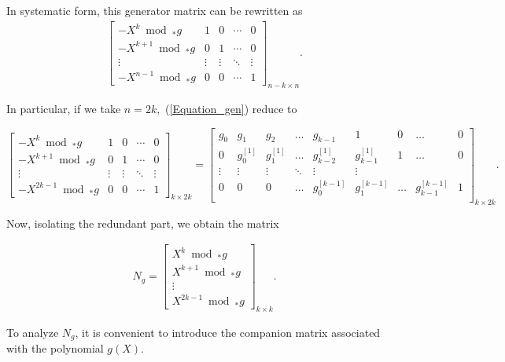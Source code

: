 \documentclass[11pt]{article}
\begin{document}
In systematic form, this generator matrix can be rewritten as
\begin{eqnarray}\label{Equation_gen}
  	\begin{bmatrix}
  		- X^k \bmod_\ast g & 1 & 0 & \cdots & 0 \\
  		- X^{k+1} \bmod_\ast g & 0 & 1 & \cdots & 0 \\
  		\vdots & \vdots & \vdots & \ddots & \vdots \\
  		- X^{n-1} \bmod_\ast g & 0 & 0 & \cdots & 1
  	\end{bmatrix}_{n-k\times n}.
\end{eqnarray}

In particular, if we take $n=2k,$ (\ref{Equation_gen}) reduce to 

$$\begin{bmatrix}
  		- X^k \bmod_\ast g & 1 & 0 & \cdots & 0 \\
  		- X^{k+1} \bmod_\ast g & 0 & 1 & \cdots & 0 \\
  		\vdots & \vdots & \vdots & \ddots & \vdots \\
  		- X^{2k-1} \bmod_\ast g & 0 & 0 & \cdots & 1
  	\end{bmatrix}_{k\times 2k}=\begin{bmatrix}
  	    g_0&g_1&g_2&\dots&g_{k-1}&1&0&\dots&0\\
        0&g^{[1]}_0&g^{[1]}_1&\dots&g^{[1]}_{k-2}&g^{[1]}_{k-1}&1&\dots&0\\
        \vdots&\vdots&\vdots&\ddots&\vdots&\vdots\\
        0&0&0&\dots&g^{[k-1]}_0&g^{[k-1]}_1&\dots&g^{[k-1]}_{k-1}&1\\
  	\end{bmatrix}_{k\times 2k}.$$

Now, isolating the redundant part, we obtain the matrix

\begin{eqnarray} \label{eqn5.3-GR}
  	N_g = \begin{bmatrix}
  		X^k \bmod_\ast g \\
  		X^{k+1} \bmod_\ast g \\
  		\vdots \\
  		X^{2k-1} \bmod_\ast g
  	\end{bmatrix}_{k\times k}.
\end{eqnarray}

\noindent To analyze $N_g$, it is convenient to introduce the companion matrix associated with 
the polynomial $g(X)$.
\end{document}
